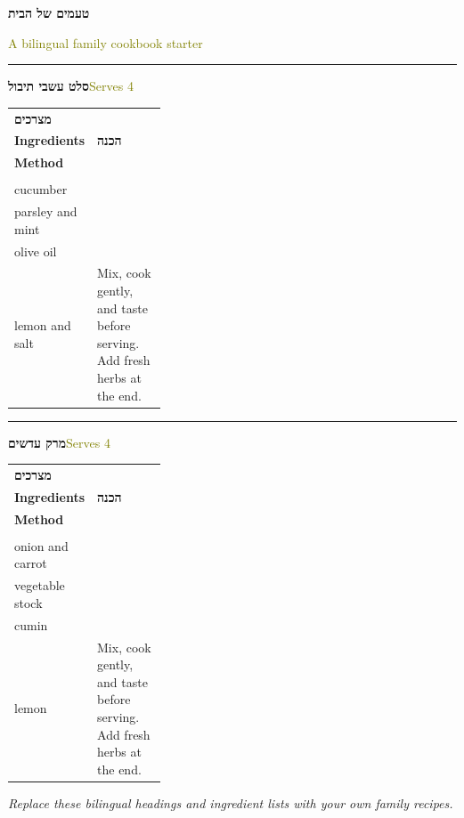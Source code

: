 \documentclass[a4paper,12pt]{article}
\makeatletter
\newcommand{\dish}[3]{\noindent\textcolor{pomegranate}{\rule{\linewidth}{1pt}}\par
  {\Large\bfseries #1}\hfill\textcolor{olive}{#2}\par\smallskip
  \begin{tabularx}{\linewidth}{@{}p{0.34\linewidth}X@{}}
    \textbf{מצרכים}\\[-1pt]\textbf{Ingredients} & \textbf{הכנה}\\[-1pt]\textbf{Method}\tabularnewline[2pt]
    \begin{minipage}[t]{\linewidth}#3\end{minipage} & \begin{minipage}[t]{\linewidth}Mix, cook gently, and taste before serving. Add fresh herbs at the end.\end{minipage}
  \end{tabularx}\par\medskip}
\makeatother
\begin{document}
\begin{center}{\Huge\bfseries\color{pomegranate} טעמים של הבית}\par\vspace{2mm}{\Large Flavours of Home}\par\smallskip\textcolor{olive}{A bilingual family cookbook starter}\end{center}
\bigskip
\dish{סלט עשבי תיבול}{Serves 4}{%
  tomatoes\\cucumber\\parsley and mint\\olive oil\\lemon and salt}
\dish{מרק עדשים}{Serves 4}{%
  red lentils\\onion and carrot\\vegetable stock\\cumin\\lemon}
\begin{center}\small\textit{Replace these bilingual headings and ingredient lists with your own family recipes.}\end{center}
\end{document}
